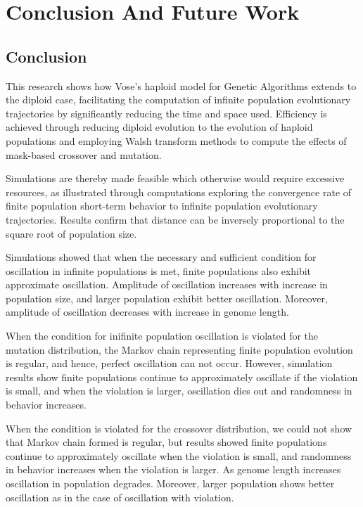 \chapter{Conclusion And Future Work}
\section{Conclusion}
This research shows how Vose's haploid model for Genetic Algorithms
extends to the diploid case, facilitating the computation of infinite
population evolutionary trajectories by significantly reducing the
time and space used.  Efficiency is achieved through reducing diploid evolution 
to the evolution of haploid populations
and employing Walsh transform methods to compute the effects of
mask-based crossover and mutation.  

Simulations are thereby made feasible which otherwise would require
excessive resources, as illustrated through computations exploring 
the convergence rate of finite population short-term behavior to infinite population evolutionary trajectories. 
Results confirm that distance can be inversely proportional to the square root of population size.

Simulations showed that when the necessary and sufficient condition for oscillation in infinite populations is met, 
finite populations also exhibit approximate oscillation. Amplitude of oscillation increases with 
increase in population size, and larger population exhibit better oscillation. Moreover, amplitude of 
oscillation decreases with increase in genome length.

When the condition for inifinite population oscillation is violated for the mutation distribution, 
the Markov chain representing finite population evolution is regular, and hence, 
perfect oscillation can not occur. However, simulation results show 
finite populations continue to approximately oscillate if the violation is small, 
and when the violation is larger, oscillation dies out and randomness in behavior increases. 

When the condition is violated for the crossover distribution,
we could not show that Markov chain formed is regular, 
but results showed finite populations continue to approximately oscillate 
when the violation is small, and randomness in behavior increases when the violation is larger. 
As genome length increases oscillation in population degrades. 
Moreover, larger population shows better oscillation 
as in the case of oscillation with violation.

